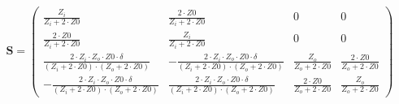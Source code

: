 \begin{equation} \mathbf{S} = \left(\begin{array}{cccc}
\frac{Z_i}{Z_i+2\cdot Z0} & \frac{2\cdot Z0}{Z_i+2\cdot Z0} & 0 & 0 \\
\frac{2\cdot Z0}{Z_i+2\cdot Z0} & \frac{Z_i}{Z_i+2\cdot Z0} & 0 & 0 \\
\frac{2\cdot Z_i\cdot Z_o\cdot Z0\cdot \delta}{ (Z_i+2\cdot Z0 )\cdot
(Z_o+2\cdot Z0 )} & -\frac{2\cdot Z_i\cdot Z_o\cdot Z0\cdot \delta}{
(Z_i+2\cdot Z0 )\cdot (Z_o+2\cdot Z0 )} & \frac{Z_o}{Z_o+2\cdot Z0} &
\frac{2\cdot Z0}{Z_o+2\cdot Z0} \\ -\frac{2\cdot Z_i\cdot Z_o\cdot
Z0\cdot \delta}{ (Z_i+2\cdot Z0 )\cdot (Z_o+2\cdot Z0 )} &
\frac{2\cdot Z_i\cdot Z_o\cdot Z0\cdot \delta}{ (Z_i+2\cdot Z0 )\cdot
(Z_o+2\cdot Z0 )} & \frac{2\cdot Z0}{Z_o+2\cdot Z0} &
\frac{Z_o}{Z_o+2\cdot Z0} \end{array}\right) \end{equation}
